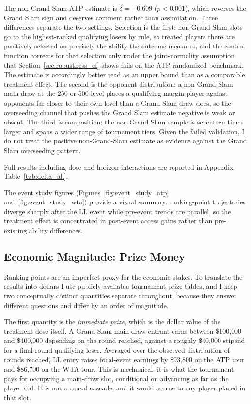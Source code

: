 The non-Grand-Slam ATP estimate is $\hat{\delta} = +0.609$ ($p < 0.001$), which reverses the Grand Slam sign and deserves comment rather than assimilation. Three differences separate the two settings. Selection is the first: non-Grand-Slam slots go to the highest-ranked qualifying losers by rule, so treated players there are positively selected on precisely the ability the outcome measures, and the control function corrects for that selection only under the joint-normality assumption that Section~\ref{sec:robustness_cf} shows fails on the ATP randomized benchmark. The estimate is accordingly better read as an upper bound than as a comparable treatment effect. The second is the opponent distribution: a non-Grand-Slam main draw at the 250 or 500 level places a qualifying-margin player against opponents far closer to their own level than a Grand Slam draw does, so the overseeding channel that pushes the Grand Slam estimate negative is weak or absent. The third is composition: the non-Grand-Slam sample is seventeen times larger and spans a wider range of tournament tiers. Given the failed validation, I do not treat the positive non-Grand-Slam estimate as evidence against the Grand Slam overseeding pattern.

Full results including dose and horizon interactions are reported in Appendix Table~\ref{tab:delta_all}.

The event study figures (Figures~\ref{fig:event_study_atp} and~\ref{fig:event_study_wta}) provide a visual summary: ranking-point trajectories diverge sharply after the LL event while pre-event trends are parallel, so the treatment effect is concentrated in post-event access gains rather than pre-existing ability differences.

\subsection{Economic Magnitude: Prize Money}
\label{sec:mechanisms_prize}

Ranking points are an imperfect proxy for the economic stakes. To translate the results into dollars I use publicly available tournament prize tables, and I keep two conceptually distinct quantities separate throughout, because they answer different questions and differ by an order of magnitude.

The first quantity is the \textit{immediate prize}, which is the dollar value of the treatment dose itself. A Grand Slam main-draw entrant earns between \$100{,}000 and \$400{,}000 depending on the round reached, against a roughly \$40{,}000 stipend for a final-round qualifying loser. Averaged over the observed distribution of rounds reached, LL entry raises focal-event earnings by \$93{,}800 on the ATP tour and \$86{,}700 on the WTA tour. This is mechanical: it is what the tournament pays for occupying a main-draw slot, conditional on advancing as far as the player did. It is not a causal cascade, and it would accrue to any player placed in that slot.

